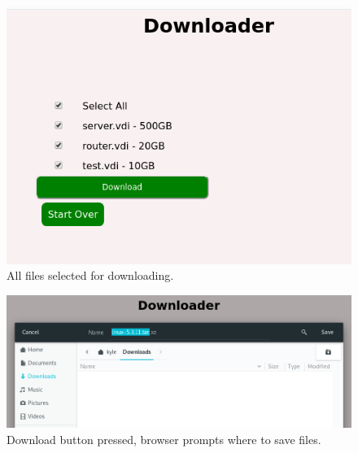 \documentclass{article}
\begin{document}
    \begin{figure}[h]
    \includegraphics[scale=.7]{s5}
        \caption{All files selected for downloading.}
    \end{figure}

    \begin{figure}[h]
    \includegraphics[scale=.5]{s6}
        \caption{Download button pressed, browser prompts where to save files.}
    \end{figure}
\end{document}
